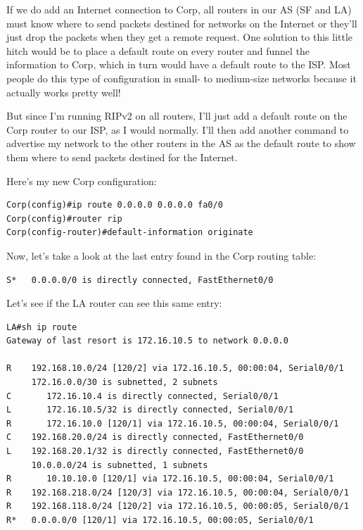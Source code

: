 If we do add an Internet connection to Corp, all routers in our AS (SF
and LA) must know where to send packets destined for networks on the
Internet or they'll just drop the
\protect\hypertarget{c09.xhtmlux5cux23Page_398}{}{}packets when they get
a remote request. One solution to this little hitch would be to place a
default route on every router and funnel the information to Corp, which
in turn would have a default route to the ISP. Most people do this type
of configuration in small- to medium-size networks because it actually
works pretty well!

But since I'm running RIPv2 on all routers, I'll just add a default
route on the Corp router to our ISP, as I would normally. I'll then add
another command to advertise my network to the other routers in the AS
as the default route to show them where to send packets destined for the
Internet.

Here's my new Corp configuration:

\begin{verbatim}
Corp(config)#ip route 0.0.0.0 0.0.0.0 fa0/0
Corp(config)#router rip
Corp(config-router)#default-information originate
\end{verbatim}

Now, let's take a look at the last entry found in the Corp routing
table:

\begin{verbatim}
S*   0.0.0.0/0 is directly connected, FastEthernet0/0
\end{verbatim}

Let's see if the LA router can see this same entry:

\begin{verbatim}
LA#sh ip route
Gateway of last resort is 172.16.10.5 to network 0.0.0.0

R    192.168.10.0/24 [120/2] via 172.16.10.5, 00:00:04, Serial0/0/1
     172.16.0.0/30 is subnetted, 2 subnets
C       172.16.10.4 is directly connected, Serial0/0/1
L       172.16.10.5/32 is directly connected, Serial0/0/1
R       172.16.10.0 [120/1] via 172.16.10.5, 00:00:04, Serial0/0/1
C    192.168.20.0/24 is directly connected, FastEthernet0/0
L    192.168.20.1/32 is directly connected, FastEthernet0/0
     10.0.0.0/24 is subnetted, 1 subnets
R       10.10.10.0 [120/1] via 172.16.10.5, 00:00:04, Serial0/0/1
R    192.168.218.0/24 [120/3] via 172.16.10.5, 00:00:04, Serial0/0/1
R    192.168.118.0/24 [120/2] via 172.16.10.5, 00:00:05, Serial0/0/1
R*   0.0.0.0/0 [120/1] via 172.16.10.5, 00:00:05, Serial0/0/1
\end{verbatim}

